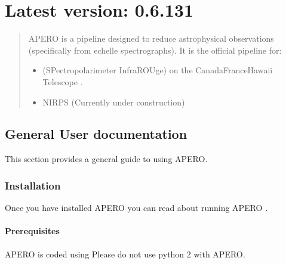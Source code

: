 \documentclass[a4paper,10pt,english]{report}
\begin{document}
\chapter{Latest version: 0.6.131}
\label{\detokenize{index:latest-version-0-6-131}}\label{\detokenize{index:apero-doc-main-latest}}\begin{quote}

APERO is a pipeline designed to reduce astrophysical observations (specifically from echelle spectrographs).
It is the official pipeline for:
\begin{itemize}
\item {} 
 (SPectropolarimeter InfraROUge) on the Canada\sphinxhyphen{}France\sphinxhyphen{}Hawaii Telescope .

\item {} 
NIRPS (Currently under construction)

\end{itemize}
\end{quote}


\section{General User documentation}
\label{\detokenize{user/general_guide:general-user-documentation}}\label{\detokenize{user/general_guide:general-guide}}\label{\detokenize{user/general_guide::doc}}
This section provides a general guide to using APERO.


\subsection{Installation}
\label{\detokenize{user/general/installation:installation}}\label{\detokenize{user/general/installation:id1}}\label{\detokenize{user/general/installation::doc}}
Once you have installed APERO you can read about running APERO
{\hyperref[\detokenize{user/general/using_apero_default:using-apero-default}]{}}.


\subsubsection{Prerequisites}
\label{\detokenize{user/general/installation:prerequisites}}\label{\detokenize{user/general/installation:installation-prerequisites}}
APERO is coded using 
Please do not use python 2 with APERO.
\end{document}
